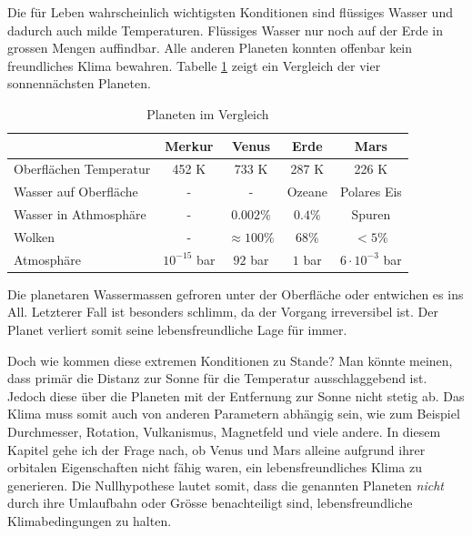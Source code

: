 \begin{refsection}
Die für Leben wahrscheinlich wichtigsten Konditionen sind flüssiges Wasser und dadurch auch milde Temperaturen. Flüssiges Wasser nur noch auf der Erde in grossen Mengen auffindbar.
Alle anderen Planeten konnten offenbar kein freundliches Klima bewahren. Tabelle \ref{planeten_comparison} zeigt ein Vergleich der vier sonnennächsten Planeten.
\begin{center}
\begin{table}
	\center
	\begin{tabular}{l|c c c c}
							& Merkur			& Venus				& Erde		& Mars                  \\
  \hline
  Oberflächen Temperatur	& 452 K				& 733 K				& 287 K		& 226 K                 \\
  Wasser auf Oberfläche		& -					& -					& Ozeane	& Polares Eis			\\
  Wasser in Athmosphäre		& -					& $0.002\%$ 		& $0.4\%$	& Spuren				\\
  Wolken					& -					& $\approx100\%$	& $68\%$  	& $<5\%$                \\
  Atmosphäre				& $10^{-15}$ bar	& $92$ bar			& $1$ bar	& $6 \cdot 10^{-3}$ bar 
\end{tabular}
\caption{Planeten im Vergleich}
\label{planeten_comparison}
\end{table}
\end{center}
Die planetaren Wassermassen gefroren unter der Oberfläche oder entwichen es ins All. Letzterer Fall ist besonders schlimm, da der Vorgang irreversibel ist. Der Planet verliert somit seine lebensfreundliche Lage für immer.

Doch wie kommen diese extremen Konditionen zu Stande? Man könnte meinen, dass primär die Distanz zur Sonne für die Temperatur ausschlaggebend ist. Jedoch diese über die Planeten mit der Entfernung zur Sonne nicht stetig ab.
Das Klima muss somit auch von anderen Parametern abhängig sein, wie zum Beispiel Durchmesser, Rotation, Vulkanismus, Magnetfeld und viele andere.
In diesem Kapitel gehe ich der Frage nach, ob Venus und Mars alleine aufgrund ihrer orbitalen Eigenschaften nicht fähig waren, ein lebensfreundliches Klima zu generieren. Die Nullhypothese lautet somit, dass die genannten Planeten \textit{nicht} durch ihre Umlaufbahn oder Grösse benachteiligt sind, lebensfreundliche Klimabedingungen zu halten.



\end{refsection}
